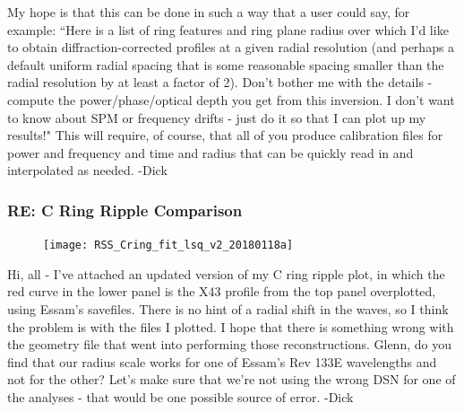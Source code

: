 \documentclass[crop=false,class=article,oneside]{standalone}
\begin{document}
My hope is that this can be done in such a way that a user could say, for example: ``Here is a list of ring features and ring plane radius over which I'd like to obtain diffraction-corrected profiles at a given radial resolution (and perhaps a default uniform radial spacing that is some reasonable spacing smaller than the radial resolution by at least a factor of 2). Don't bother me with the details - compute the power/phase/optical depth you get from this inversion. I don't want to know about SPM or frequency drifts - just do it so that I can plot up my results!" This will require, of course, that all of you produce calibration files for power and frequency and time and radius that can be quickly read in and interpolated as needed. -Dick
\subsubsection{\footnotesize RE: C Ring Ripple Comparison}
\begin{figure}[H]
    \centering
    \texttt{[image: RSS\_Cring\_fit\_lsq\_v2\_20180118a]}
\end{figure}
Hi, all - I've attached an updated version of my C ring ripple plot, in which the red curve in the lower panel is the X43 profile from the top panel overplotted, using Essam's savefiles. There is no hint of a radial shift in the waves, so I think the problem is with the files I plotted. I hope that there is something wrong with the geometry file that went into performing those reconstructions. Glenn, do you find that our radius scale works for one of Essam's Rev 133E wavelengths and not for the other? Let's make sure that we're not using the wrong DSN for one of the analyses - that would be one possible source of error. -Dick
\end{document}
